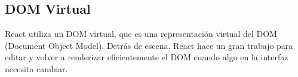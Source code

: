 

\subsection{DOM Virtual}
React utiliza un DOM virtual, que es una representación virtual del DOM (Document Object Model). Detrás de escena, React hace un gran trabajo para editar y volver a renderizar eficientemente el DOM cuando algo en la interfaz necesita cambiar.
